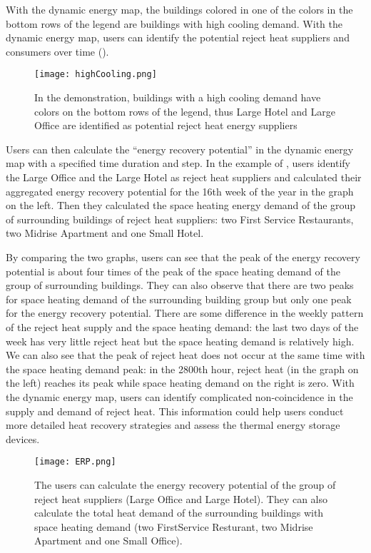 With the dynamic energy map, the buildings colored in one of the
colors in the bottom rows of the legend are buildings with high
cooling demand. With the dynamic energy map, users can identify the
potential reject heat suppliers and consumers over time
().

\begin{figure}[h!]
  \centering
  \texttt{[image: highCooling.png]}
  \caption[Identify Buildings with High Cooling Demand]{In the
    demonstration, buildings with a high cooling demand have colors on
    the bottom rows of the legend, thus Large Hotel and Large Office
    are identified as potential reject heat energy suppliers}
  \label{fig:highCooling}
\end{figure}

Users can then calculate the ``energy recovery potential'' in the
dynamic energy map with a specified time duration and step.  In the
example of , users identify the Large Office and the
Large Hotel as reject heat suppliers and calculated their aggregated
energy recovery potential for the 16th week of the year in the graph
on the left. Then they calculated the space heating energy demand of
the group of surrounding buildings of reject heat suppliers: two First
Service Restaurants, two Midrise Apartment and one Small Hotel. 

By comparing the two graphs, users can see that the peak of the energy
recovery potential is about four times of the peak of the space
heating demand of the group of surrounding buildings. They can also
observe that there are two peaks for space heating demand of the
surrounding building group but only one peak for the energy recovery
potential. There are some difference in the weekly pattern of the
reject heat supply and the space heating demand: the last two days of
the week has very little reject heat but the space heating demand is
relatively high. We can also see that the peak of reject heat does not
occur at the same time with the space heating demand peak: in the
2800th hour, reject heat (in the graph on the left) reaches its peak
while space heating demand on the right is zero. With the dynamic
energy map, users can identify complicated non-coincidence in the
supply and demand of reject heat. This information could help users
conduct more detailed heat recovery strategies and assess the thermal
energy storage devices.

\begin{figure}[h!]
  \centering
  \texttt{[image: ERP.png]}
  \caption[Calculate Energy Recovery Potential]{The users can
    calculate the energy recovery potential of the group of reject
    heat suppliers (Large Office and Large Hotel). They can also
    calculate the total heat demand of the surrounding buildings with
    space heating demand (two FirstService Resturant, two Midrise
    Apartment and one Small Office).}
  \label{fig:ERP}
\end{figure}

